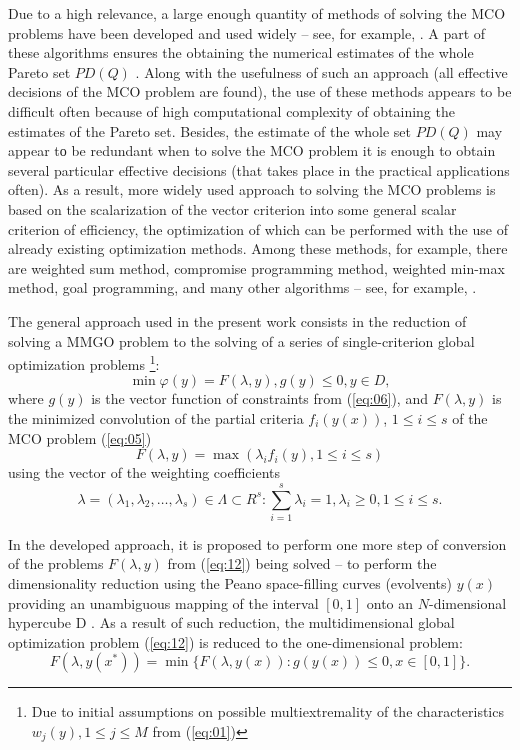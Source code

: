 \documentclass{svproc}
\begin{document}
Due to a high relevance, a large enough quantity of methods of solving the MCO problems have been developed and used widely -- see, for example, \cite{x2,x3,x4,x5,x6,x7,x8,x9,x10}. A part of these algorithms ensures the obtaining the numerical estimates of the whole Pareto set $PD(Q)$ \cite{x3,x26,x27,x28}. Along with the usefulness of such an approach (all effective decisions of the MCO problem are found), the use of these methods appears to be difficult often because of high computational complexity of obtaining the estimates of the Pareto set. Besides, the estimate of the whole set $PD(Q)$ may appear tо be redundant when to solve the MCO problem it is enough to obtain several particular effective decisions (that takes place in the practical applications often). As a result, more widely used approach to solving the MCO problems is based on the scalarization of the vector criterion into some general scalar criterion of efficiency, the optimization of which can be performed with the use of already existing optimization methods. Among these methods, for example, there are weighted sum method, compromise programming method, weighted min-max method, goal programming, and many other algorithms -- see, for example, \cite{x2,x3,x4,x5,x6}. 

The general approach used in the present work consists in the reduction of solving a MMGO problem to the solving of a series of single-criterion global optimization problems \footnote{Due to initial assumptions on possible multiextremality of the characteristics $w_j(y), 1 \leq j \leq M$ from (\ref{eq:01})}: 
\begin{equation}
\label{eq:12}
\min {\varphi(y)}=F(\lambda,y), g(y) \leq 0, y \in D, 
\end{equation}
where $g(y)$ is the vector function of constraints from (\ref{eq:06}), and $F(\lambda,y)$ is the minimized convolution of the partial criteria $f_i(y(x))$, $1 \leq i \leq s$ of the MCO problem (\ref{eq:05})
\begin{equation}
\label{eq:13}
F(\lambda,y)=\max{⁡(\lambda_i f_i (y), 1 \leq i \leq s)} 
\end{equation}
using the vector of the weighting coefficients 
\begin{equation}
\label{eq:14}
\lambda=(\lambda_1, \lambda_2, \dots , \lambda_s )\in \Lambda \subset R^s: \sum_{i=1}^s{\lambda_i=1}, \lambda_i \geq 0, 1 \leq i \leq s.
\end{equation}

In the developed approach, it is proposed to perform one more step of conversion of the problems $F(\lambda,y)$ from (\ref{eq:12}) being solved -- to perform the dimensionality reduction using the Peano space-filling curves (evolvents) $y(x)$ providing an unambiguous mapping of the interval $[0,1]$ onto an $N$-dimensional hypercube D \cite{x18,x20}. As a result of such reduction, the multidimensional global optimization problem (\ref{eq:12}) is reduced to the one-dimensional problem:
\begin{equation}
\label{eq:15}
F(\lambda,y(x^*)) = \min{\{F(\lambda,y(x)): g(y(x)) \leq 0, x \in [0,1]\}}.
\end{equation}
\end{document}
